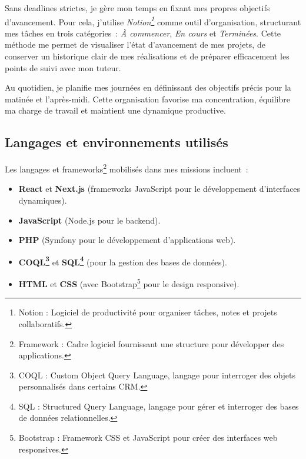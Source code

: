 Sans deadlines strictes, je gère mon temps en fixant mes propres objectifs d’avancement. Pour cela, j’utilise \textit{Notion\footnote{Notion : Logiciel de productivité pour organiser tâches, notes et projets collaboratifs.}
} comme outil d’organisation, structurant mes tâches en trois catégories~: \textit{À commencer}, \textit{En cours} et \textit{Terminées}. Cette méthode me permet de visualiser l’état d’avancement de mes projets, de conserver un historique clair de mes réalisations et de préparer efficacement les points de suivi avec mon tuteur.

Au quotidien, je planifie mes journées en définissant des objectifs précis pour la matinée et l’après-midi. Cette organisation favorise ma concentration, équilibre ma charge de travail et maintient une dynamique productive.

\subsection{Langages et environnements utilisés}

Les langages et frameworks\footnote{Framework : Cadre logiciel fournissant une structure pour développer des applications.} mobilisés dans mes missions incluent~:\vspace{0.3cm}

\begin{itemize}
    \item \textbf{React} et \textbf{Next.js} (frameworks JavaScript pour le développement d’interfaces dynamiques).\vspace{0.3cm}
    \item \textbf{JavaScript} (Node.js pour le backend).\vspace{0.3cm}
    \item \textbf{PHP} (Symfony pour le développement d’applications web).\vspace{0.3cm}
    \item \textbf{COQL\footnote{COQL : Custom Object Query Language, langage pour interroger des objets personnalisés dans certains CRM.} }et \textbf{SQL\footnote{SQL : Structured Query Language, langage pour gérer et interroger des bases de données relationnelles.}
} (pour la gestion des bases de données).\vspace{0.3cm}
    \item \textbf{HTML} et \textbf{CSS} (avec Bootstrap\footnote{Bootstrap : Framework CSS et JavaScript pour créer des interfaces web responsives.} pour le design responsive).\vspace{0.3cm}
\end{itemize}

